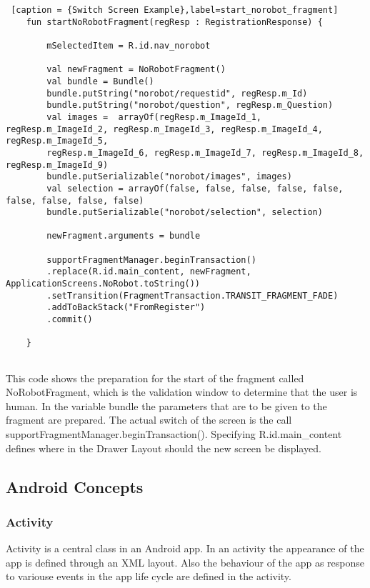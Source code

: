 \begin{lstlisting} [caption = {Switch Screen Example},label=start_norobot_fragment]
	fun startNoRobotFragment(regResp : RegistrationResponse) {
		
		mSelectedItem = R.id.nav_norobot  
		
		val newFragment = NoRobotFragment()
		val bundle = Bundle()
		bundle.putString("norobot/requestid", regResp.m_Id)
		bundle.putString("norobot/question", regResp.m_Question)
		val images =  arrayOf(regResp.m_ImageId_1, regResp.m_ImageId_2, regResp.m_ImageId_3, regResp.m_ImageId_4, regResp.m_ImageId_5,
		regResp.m_ImageId_6, regResp.m_ImageId_7, regResp.m_ImageId_8, regResp.m_ImageId_9)
		bundle.putSerializable("norobot/images", images)
		val selection = arrayOf(false, false, false, false, false, false, false, false, false)
		bundle.putSerializable("norobot/selection", selection)
		
		newFragment.arguments = bundle
		
		supportFragmentManager.beginTransaction()
		.replace(R.id.main_content, newFragment, ApplicationScreens.NoRobot.toString())
		.setTransition(FragmentTransaction.TRANSIT_FRAGMENT_FADE)
		.addToBackStack("FromRegister")
		.commit()
		
	}
	
\end{lstlisting}

This code shows the preparation for the start of the fragment called NoRobotFragment, which is the validation window to determine that the user is human. In the variable bundle the parameters that are to be given to the fragment are prepared. The actual switch of the screen is the call supportFragmentManager.beginTransaction(). Specifying R.id.main\_content defines where in the Drawer Layout should the new screen be displayed.  

\subsection { Android Concepts }

\subsubsection { Activity }

Activity is a central class in an Android app. In an activity the appearance of the app is defined through an XML layout. Also the behaviour of the app as response to variouse events in the app life cycle are defined in the activity.

